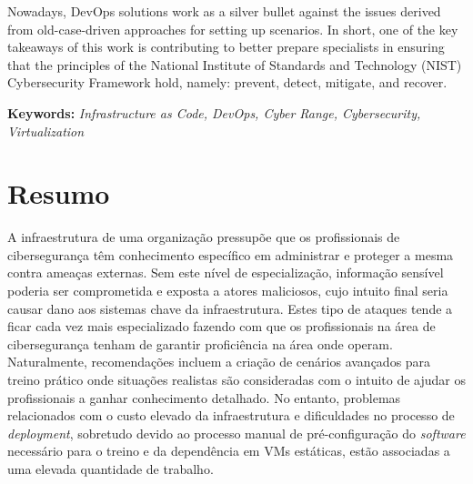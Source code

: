 Nowadays, DevOps solutions work as a silver bullet against the issues derived from old-case-driven approaches for setting up scenarios. In short, one of the key takeaways of this work is contributing to better prepare specialists in ensuring that the principles of the National Institute of Standards and Technology (NIST) Cybersecurity Framework hold, namely: prevent, detect, mitigate, and recover.\\

\newcommand{\titles}[2]{\noindent\textbf{#1:} #2\\[2mm]}

\titles{Keywords}{\textit{Infrastructure as Code, DevOps, Cyber Range, Cybersecurity, Virtualization}}


\clearpage\phantom{}

\chapter*{Resumo}

A infraestrutura de uma organização pressupõe que os profissionais de cibersegurança têm conhecimento específico em administrar e proteger a mesma contra ameaças externas. Sem este nível de especialização, informação sensível poderia ser comprometida e exposta a atores maliciosos, cujo intuito final seria causar dano aos sistemas chave da infraestrutura. Estes tipo de ataques tende a ficar cada vez mais especializado fazendo com que os profissionais na área de cibersegurança tenham de garantir proficiência na área onde operam. Naturalmente, recomendações incluem a criação de cenários avançados para treino prático onde situações realistas são consideradas com o intuito de ajudar os profissionais a ganhar conhecimento detalhado. No entanto, problemas relacionados com o custo elevado da infraestrutura e dificuldades no processo de \textit{deployment}, sobretudo devido ao processo manual de pré-configuração do \textit{software} necessário para o treino e da dependência em VMs estáticas, estão associadas a uma elevada quantidade de trabalho.

